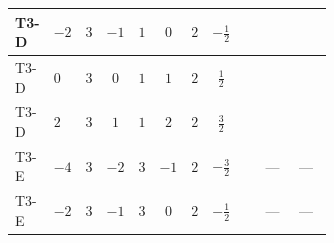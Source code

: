 \documentclass[8pt]{article}
\begin{document}
\begin{landscape}
\begin{longtable}{@{}llcccccc >{\raggedright\arraybackslash}p{0.21\linewidth} >{\raggedright\arraybackslash}p{0.21\linewidth} >{\raggedright\arraybackslash}p{0.21\linewidth}@{}}
\midrule
T3-D & $-2$ & $3$ & $-1$ & $1$ & $0$ & $2$ & $-\frac{1}{2}$ & \scriptsize\adjustbox{max width=\linewidth}{$\begin{gathered} +4 {\lambda_{12}^{(1)}}^2\end{gathered}$} & \scriptsize\adjustbox{max width=\linewidth}{$\begin{gathered} +8 {\lambda_{12}^{(1)}} {\lambda_{S_1}^{(1)}}\end{gathered}$} & \scriptsize\adjustbox{max width=\linewidth}{$\begin{gathered} +4 {\lambda_{12}^{(1)}} {\lambda_{S_2}^{(1)}}\end{gathered}$} \\
\midrule
T3-D & $0$ & $3$ & $0$ & $1$ & $1$ & $2$ & $\frac{1}{2}$ & \scriptsize\adjustbox{max width=\linewidth}{$\begin{gathered} +4 {\lambda_{12}^{(1)}}^2\end{gathered}$} & \scriptsize\adjustbox{max width=\linewidth}{$\begin{gathered} +8 {\lambda_{12}^{(1)}} {\lambda_{S_1}^{(1)}}\end{gathered}$} & \scriptsize\adjustbox{max width=\linewidth}{$\begin{gathered} +4 {\lambda_{12}^{(1)}} {\lambda_{S_2}^{(1)}}\end{gathered}$} \\
\midrule
T3-D & $2$ & $3$ & $1$ & $1$ & $2$ & $2$ & $\frac{3}{2}$ & \scriptsize\adjustbox{max width=\linewidth}{$\begin{gathered} +4 {\lambda_{12}^{(1)}}^2\end{gathered}$} & \scriptsize\adjustbox{max width=\linewidth}{$\begin{gathered} +8 {\lambda_{12}^{(1)}} {\lambda_{S_1}^{(1)}}\end{gathered}$} & \scriptsize\adjustbox{max width=\linewidth}{$\begin{gathered} +4 {\lambda_{12}^{(1)}} {\lambda_{S_2}^{(1)}}\end{gathered}$} \\
\midrule
T3-E & $-4$ & $3$ & $-2$ & $3$ & $-1$ & $2$ & $-\frac{3}{2}$ & \scriptsize\adjustbox{max width=\linewidth}{$\begin{gathered} +4 {\lambda_{12}^{(1)}}^2\end{gathered}$} & --- & --- \\
\midrule
T3-E & $-2$ & $3$ & $-1$ & $3$ & $0$ & $2$ & $-\frac{1}{2}$ & \scriptsize\adjustbox{max width=\linewidth}{$\begin{gathered} +4 {\lambda_{12}^{(1)}}^2\end{gathered}$} & --- & --- \\

\end{longtable}
\end{landscape}
\end{document}
